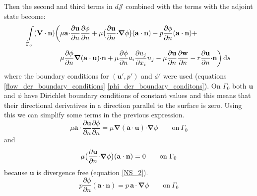 \documentclass[12pt, a4paper]{article}
\begin{document}
    Then the second and third terms in $d \mathcal{J}$ combined with the terms with the adjoint state become:
    \begin{equation} \label{cost_change_term_2345_boundary}
    \begin{split}
        \int\limits_{\Gamma_0} (\mathbf{V \cdot n}) \bigg{(} &
            \mu \mathbf{a \cdot} \frac{\partial \mathbf{u}}{\partial n} \frac{\partial \phi}{\partial n} + 
            \mu \big{(} \frac{\partial \mathbf{u}}{\partial n} \mathbf{\cdot} \boldsymbol{\nabla} \phi \big{)} 
            (\mathbf{a \cdot n}) - 
            p \frac{\partial \phi}{\partial n} (\mathbf{a \cdot n}) + \\
        &\mu \frac{\partial \phi}{\partial n} \boldsymbol{\nabla} (\mathbf{a \cdot u}) \mathbf{\cdot n} + 
            \mu \frac{\partial \phi}{\partial n} a_i \frac{\partial u_j}{\partial x_i} n_j - 
            \mu \frac{\partial \mathbf{u}}{\partial n} \frac{\partial \mathbf{w}}{\partial n} - 
            r \frac{\partial \mathbf{u}}{\partial n} \mathbf{\cdot n}
        \bigg{)} \, \mathrm{d}s
    \end{split}
    \end{equation}
    where the boundary conditions for $(\mathbf{u'},p')$ and $\phi'$ were used (equations \ref{flow_der_boundary_conditions} \ref{phi_der_boundary_conditons}).
    On $\Gamma_0$ both $\mathbf{u}$ and $\phi$ have Dirichlet boundary conditions of constant values and this means that their directional derivatives in a direction parallel to the surface is zero. Using this we can simplify some terms in the previous expression.
    \begin{equation*}
        \mu \mathbf{a \cdot} \frac{\partial \mathbf{u}}{\partial n} \frac{\partial \phi}{\partial n} = 
        \mu \boldsymbol{\nabla}(\mathbf{a \cdot u}) \mathbf{\cdot} \boldsymbol{\nabla} \phi
        \qquad \text{on} \ \Gamma_0
    \end{equation*}
    and
    \begin{equation*}
        \mu \big{(} \frac{\partial \mathbf{u}}{\partial n} \mathbf{\cdot} \boldsymbol{\nabla} \phi \big{)} 
        (\mathbf{a \cdot n}) = 0
        \qquad \text{on} \ \Gamma_0
    \end{equation*}
    because $\mathbf{u}$ is divergence free (equation \ref{NS_2}).
    \begin{equation*}
        p \frac{\partial \phi}{\partial n} (\mathbf{a \cdot n}) = 
        p \, \mathbf{a \cdot} \boldsymbol{\nabla} \phi
        \qquad \text{on} \ \Gamma_0
    \end{equation*}
\end{document}
